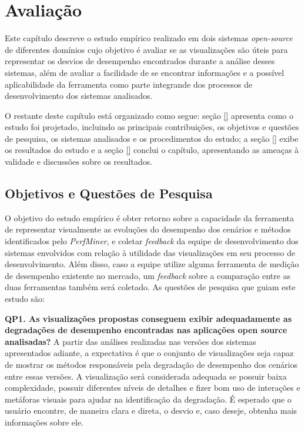 \chapter{Avaliação} \label{ch:avaliacao}

Este capítulo descreve o estudo empírico realizado em dois sistemas \textit{open-source} de diferentes domínios cujo objetivo é avaliar se as visualizações são úteis para representar os desvios de desempenho encontrados durante a análise desses sistemas, além de avaliar a facilidade de se encontrar informações e a possível aplicabilidade da ferramenta como parte integrande dos processos de desenvolvimento dos sistemas analisados.

O restante deste capítulo está organizado como segue: seção \ref{} apresenta como o estudo foi projetado, incluindo as principais contribuições, os objetivos e questões de pesquisa, os sistemas analisados e os procedimentos do estudo; a seção \ref{} exibe os resultados do estudo e a seção \ref{} conclui o capítulo, apresentando as ameaças à validade e discussões sobre os resultados.

\section{Objetivos e Questões de Pesquisa} \label{sec:objetivos-questoes-pesquisa}

O objetivo do estudo empírico é obter retorno sobre a capacidade da ferramenta de representar visualmente as evoluções do desempenho dos cenários e métodos identificados pelo \textit{PerfMiner}, e coletar \textit{feedback} da equipe de desenvolvimento dos sistemas envolvidos com relação à utilidade das visualizações em seu processo de desenvolvimento. Além disso, caso a equipe utilize alguma ferramenta de medição de desempenho existente no mercado, um \textit{feedback} sobre a comparação entre as duas ferramentas também será coletado. As questões de pesquisa que guiam este estudo são:

\textbf{QP1. As visualizações propostas conseguem exibir adequadamente as degradações de desempenho encontradas nas aplicações open source analisadas?} A partir das análises realizadas nas versões dos sistemas apresentados adiante, a expectativa é que o conjunto de visualizações seja capaz de mostrar os métodos responsáveis pela degradação de desempenho dos cenários entre essas versões. A visualização será considerada adequada se possuir baixa complexidade, possuir diferentes níveis de detalhes e fizer bom uso de interações e metáforas visuais para ajudar na identificação da degradação. É esperado que o usuário encontre, de maneira clara e direta, o desvio e, caso deseje, obtenha mais informações sobre ele.

